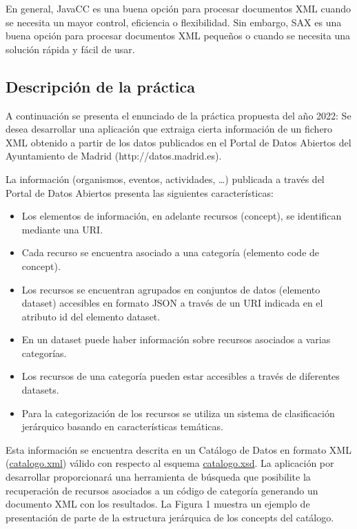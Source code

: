 En general, JavaCC es una buena opción para procesar documentos XML cuando se necesita un mayor control, eficiencia o flexibilidad. Sin embargo, SAX es una buena opción para procesar documentos XML pequeños o cuando se necesita una solución rápida y fácil de usar.

\subsection{Descripción de la práctica}

\noindent A continuación se presenta el enunciado de la práctica propuesta del año 2022:
Se desea desarrollar una aplicación que extraiga cierta información de un fichero XML obtenido a partir de los datos publicados en el Portal de Datos Abiertos del Ayuntamiento de Madrid (http://datos.madrid.es).

La información (organismos, eventos, actividades, …) publicada a través del Portal de Datos Abiertos presenta las siguientes características:

\begin{itemize}
    \item Los elementos de información, en adelante recursos (concept), se identifican mediante una URI.
    \item Cada recurso se encuentra asociado a una categoría (elemento code de concept).
    \item Los recursos se encuentran agrupados en conjuntos de datos (elemento dataset) accesibles en formato JSON a través de un URI indicada en el atributo id del elemento dataset.
    \item En un dataset puede haber información sobre recursos asociados a varias categorías.
    \item Los recursos de una categoría pueden estar accesibles a través de diferentes datasets.
    \item Para la categorización de los recursos se utiliza un sistema de clasificación jerárquico basando en características temáticas.
\end{itemize}

Esta información se encuentra descrita en un Catálogo de Datos en formato XML (\hyperref[sec:catalogoxml]{catalogo.xml}) válido con respecto al esquema \hyperref[sec:catalogoxsd]{catalogo.xsd}.
La aplicación por desarrollar proporcionará una herramienta de búsqueda que posibilite la recuperación de recursos asociados a un código de categoría generando un documento XML con los resultados.
La Figura 1 muestra un ejemplo de presentación de parte de la estructura jerárquica de los concepts del catálogo.


